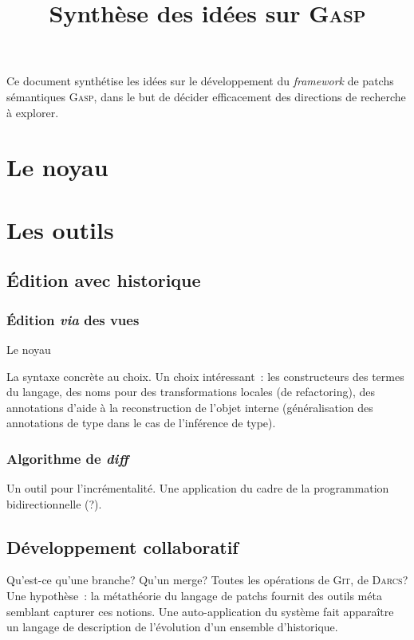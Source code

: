 \documentclass{article}
\begin{document}
\title{Synthèse des idées sur \textsc{Gasp}}

Ce document synthétise les idées sur le développement du
\textit{framework} de patchs sémantiques \textsc{Gasp}, dans le but de
décider efficacement des directions de recherche à explorer.

\section{Le noyau}

\section{Les outils}

\subsection{Édition avec historique}

\subsubsection{Édition \textit{via} des vues}

Le noyau 

La syntaxe concrète au choix. Un choix intéressant~: les constructeurs des termes du langage,
des noms pour des transformations locales (de refactoring), des annotations d'aide à la 
reconstruction de l'objet interne (généralisation des annotations de type dans le cas
de l'inférence de type). 

\subsubsection{Algorithme de \textit{diff}}

Un outil pour l'incrémentalité. Une application du cadre de la programmation bidirectionnelle (?). 

\subsection{Développement collaboratif}

Qu'est-ce qu'une branche? Qu'un merge? Toutes les opérations de \textsc{Git}, de \textsc{Darcs}? 
Une hypothèse~: la métathéorie du langage de patchs
fournit des outils méta semblant capturer ces notions. Une auto-application du système
fait apparaître un langage de description de l'évolution d'un ensemble d'historique. 
\end{document}
